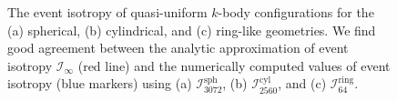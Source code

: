 \documentclass[letterpaper,11pt]{article}
\newcommand{\iso}[2]{\mathcal{I}^\text{#1}_{#2}}
\begin{document}
\begin{figure}[t!]
%
\centering
{}
\hfill
{}
\hfill
{}
\caption{The event isotropy of quasi-uniform $k$-body configurations for the (a) spherical, (b) cylindrical, and (c) ring-like geometries.
%
We find good agreement between the analytic approximation of event isotropy $\iso{}{\infty}$ (red line) and the numerically computed values of event isotropy (blue markers) using (a) $\iso{sph}{3072}$, (b) $\iso{cyl}{2560}$, and (c) $\iso{ring}{64}$.}
%
\label{fig:analytic}
%
\end{figure}
\end{document}
